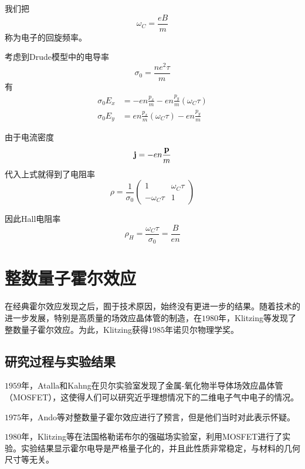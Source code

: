 我们把
\begin{equation}
    \omega_C=\frac{eB}{m}
\end{equation}
称为电子的回旋频率。

考虑到Drude模型中的电导率
\begin{equation}
    \sigma_0=\frac{ne^2\tau}{m}
\end{equation}
有
\begin{align*}
    \sigma_0 E_x & = -en\frac{p_x}{m}-en\frac{p_y}{m}(\omega_C\tau) \\
    \sigma_0 E_y & = en\frac{p_x}{m}(\omega_C\tau)-en\frac{p_y}{m}
\end{align*}

由于电流密度
\begin{equation}
    \vb j=-en\frac{\vb p}{m}
\end{equation}
代入上式就得到了电阻率
\begin{equation}
    \rho=\frac{1}{\sigma_0}\begin{pmatrix}
        1             & \omega_C\tau \\
        -\omega_C\tau & 1
    \end{pmatrix}
\end{equation}

因此Hall电阻率
\begin{equation}
    \rho_H=\frac{\omega_C\tau}{\sigma_0}=\frac{B}{en}
\end{equation}

\section{整数量子霍尔效应}

在经典霍尔效应发现之后，囿于技术原因，始终没有更进一步的结果。随着技术的进一步发展，特别是高质量的场效应晶体管的制造，在$1980$年，Klitzing等发现了整数量子霍尔效应\cite{RN30}。为此，Klitzing获得$1985$年诺贝尔物理学奖。

\subsection{研究过程与实验结果}

$1959$年，Atalla和Kahng在贝尔实验室发现了金属-氧化物半导体场效应晶体管（MOSFET），这使得人们可以研究近乎理想情况下的二维电子气中电子的情况。

$1975$年，Ando等对整数量子霍尔效应进行了预言\cite{RN30}，但是他们当时对此表示怀疑。

$1980$年，Klitzing等在法国格勒诺布尔的强磁场实验室，利用MOSFET进行了实验。实验结果显示霍尔电导是严格量子化的，并且此性质非常稳定，与材料的几何尺寸等无关。\cite{RN22}


